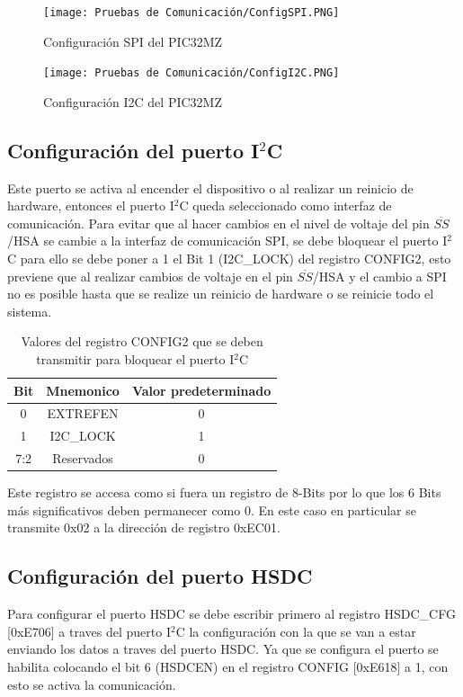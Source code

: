 \documentclass[letterpaper,12pt,oneside]{book}
\begin{document}
			\begin{figure}[!htpb]
				\centering
				\texttt{[image: Pruebas de Comunicación/ConfigSPI.PNG]}
				\caption[Configuración SPI del PIC32MZ]{Configuración SPI del PIC32MZ}
				\label{ConfigSPI} 
				\hfill \break
				\texttt{[image: Pruebas de Comunicación/ConfigI2C.PNG]}
				\caption[Configuración I2C del PIC32MZ]{Configuración I2C del PIC32MZ}
				\label{ConfigI2C}
			\end{figure}

			\subsection{Configuración del puerto I$^2$C}
			Este puerto se activa al encender el dispositivo o al realizar un reinicio de hardware, entonces el puerto I$^2$C queda seleccionado como interfaz de comunicación. Para evitar que al hacer cambios en el nivel de voltaje del pin $\overline{SS}$/HSA se cambie a la interfaz de comunicación SPI, se debe bloquear el puerto I$^2$C para ello se debe poner a 1 el Bit 1 (I2C\_LOCK) del registro CONFIG2, esto previene que al realizar cambios de voltaje en el pin $\overline{SS}$/HSA y el cambio a SPI no es posible hasta que se realize un reinicio de hardware o se reinicie todo el sistema.

			\begin{table}[ht]
				\centering
				\begin{tabular}{c | c | c}
					\textbf{Bit} & \textbf{Mnemonico} & \textbf{Valor predeterminado} \\
					\hline
					0 & EXTREFEN & 0 \\
					\hline
					1 & I2C\_LOCK & 1 \\
					\hline
					7:2 & Reservados & 0 \\
				\end{tabular}
				\caption{Valores del registro CONFIG2 que se deben transmitir para bloquear el puerto I$^2$C}
			\end{table}

			Este registro se accesa como si fuera un registro de 8-Bits por lo que los 6 Bits más significativos deben permanecer como 0. En este caso en particular se transmite 0x02 a la dirección de registro 0xEC01.

			\subsection{Configuración del puerto HSDC}
			Para configurar el puerto HSDC se debe escribir primero al registro HSDC\_CFG [0xE706] a traves del puerto I$^2$C la configuración con la que se van a estar enviando los datos a traves del puerto HSDC. Ya que se configura el puerto se habilita colocando el bit 6 (HSDCEN) en el registro CONFIG [0xE618] a 1, con esto se activa la comunicación.
\end{document}
